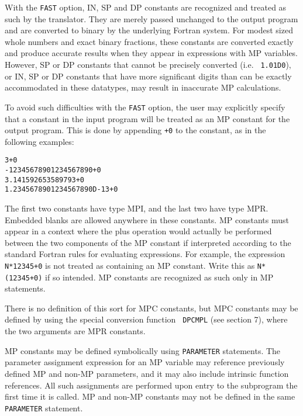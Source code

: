With the {\tt FAST} option, IN, SP and DP constants are recognized and
treated as such by the translator.  They are merely passed unchanged
to the output program and are converted to binary by the underlying
Fortran system.  For modest sized whole numbers and exact binary
fractions, these constants are converted exactly and produce accurate
results when they appear in expressions with MP variables.  However,
SP or DP constants that cannot be precisely converted (i.e. {\tt
1.01D0}), or IN, SP or DP constants that have more significant digits
than can be exactly accommodated in these datatypes, may result in
inaccurate MP calculations.

To avoid such difficulties with the {\tt FAST} option, the user may
explicitly specify that a constant in the input program will be treated
as an MP constant for the output program.  This is done by appending
{\tt +0} to the constant, as in the following examples:

\begin{tt} \begin{small} \begin{verbatim}
3+0
-12345678901234567890+0
3.141592653589793+0
1.2345678901234567890D-13+0
\end{verbatim} \end{small} \end{tt}

\noindent
The first two constants have type MPI, and the last two have type MPR.
Embedded blanks are allowed anywhere in these constants.  MP constants
must appear in a context where the plus operation would actually be
performed between the two components of the MP constant if interpreted
according to the standard Fortran rules for evaluating expressions.
For example, the expression {\tt N*12345+0} is not treated as
containing an MP constant.  Write this as {\tt N*(12345+0)} if so
intended.  MP constants are recognized as such only in MP statements.

There is no definition of this sort for MPC constants, but MPC
constants may be defined by using the special conversion function {\tt
DPCMPL} (see section 7), where the two arguments are MPR constants.

MP constants may be defined symbolically using {\tt PARAMETER}
statements.  The parameter assignment expression for an MP variable
may reference previously defined MP and non-MP parameters, and it may
also include intrinsic function references.  All such assignments are
performed upon entry to the subprogram the first time it is called.
MP and non-MP constants may not be defined in the same {\tt PARAMETER}
statement.


